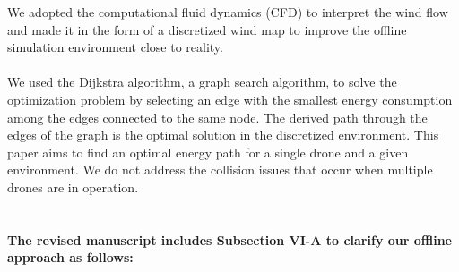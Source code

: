 \documentclass[onecolumn]{IEEEconf}
\begin{document}
\begin{description}
{    We adopted the computational fluid dynamics (CFD) to interpret the wind flow and made it in the form of a discretized wind map to improve the offline simulation environment close to reality. ~\\~\\
    We used the Dijkstra algorithm, a graph search algorithm, to solve the optimization problem by selecting an edge with the smallest energy consumption among the edges connected to the same node. The derived path through the edges of the graph is the optimal solution in the discretized environment. This paper aims to find an optimal energy path for a single drone and a given environment. We do not address the collision issues that occur when multiple drones are in operation.}
    ~\\
    ~\\
    ~\\
    \textbf{The revised manuscript includes Subsection VI-A to clarify our offline approach as follows:}~\\


\end{description}
\end{document}
